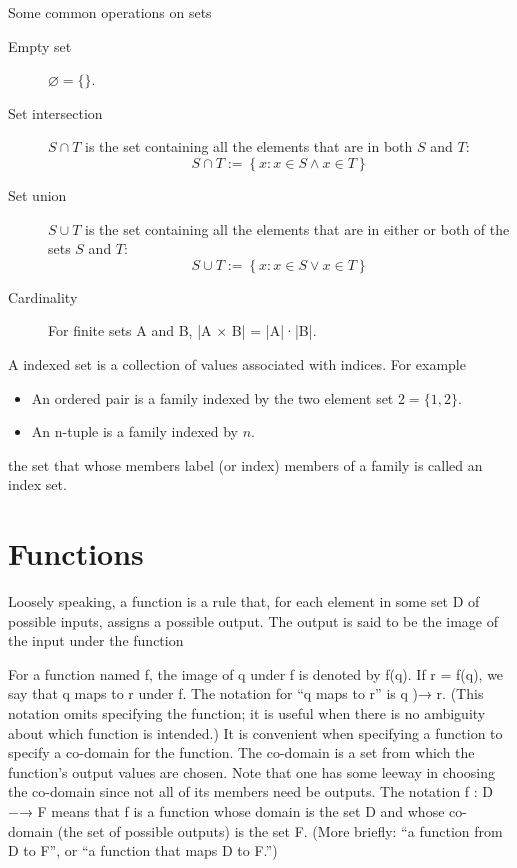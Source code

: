 Some common operations on sets
\begin{description}
\item[Empty set] $\varnothing = \{\}$.
\item[Set intersection] $S \cap T$ is the set containing all the elements that are in both $S$ and $T$:
\begin{equation}
S \cap T := \left\{{x: x \in S \land x \in T}\right\}
\end{equation}
\item[Set union] $S \cup T$ is the set containing all the elements that are in either or both of the sets $S$ and $T$:
\begin{equation}
S \cup T := \left\{{x: x \in S \lor x \in T}\right\}
\end{equation}
\item[Cardinality] For finite sets A and B, |A × B| = |A|·|B|. 
\end{description}

A indexed set is a collection of values associated with indices. For example
\begin{itemize}
\item An ordered pair is a family indexed by the two element set $2 = \{1, 2\}$.
\item An n-tuple is a family indexed by $n$.
\end{itemize}
the set that whose members label (or index) members of a family is called an index set. 

\section{Functions}
Loosely speaking, a function is a rule that, for each element in some set D of possible inputs,  assigns a possible output. The output is said to be the image of the input under the function 

For a function named f, the image of q under f is denoted by f(q). If r = f(q), we say that  q maps to r under f. The notation for “q maps to r” is q )→ r. (This notation omits specifying  the function; it is useful when there is no ambiguity about which function is intended.)  It is convenient when specifying a function to specify a co-domain for the function. The  co-domain is a set from which the function’s output values are chosen. Note that one has some  leeway in choosing the co-domain since not all of its members need be outputs.  The notation  f : D −→ F  means that f is a function whose domain is the set D and whose co-domain (the set of possible  outputs) is the set F. (More briefly: “a function from D to F”, or “a function that maps D to F.”) 


